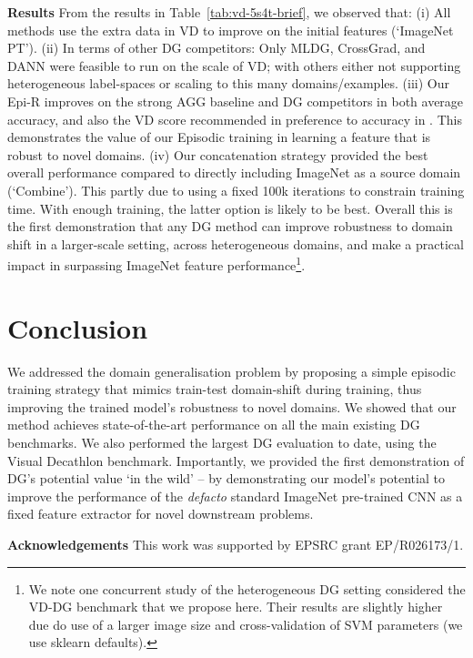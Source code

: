 \documentclass[10pt,twocolumn,letterpaper]{article}
\newcommand{\keypoint}[1]{\vspace{0.1cm}\noindent\textbf{#1}\quad}
\begin{document}
\keypoint{Results} From the results in Table~\ref{tab:vd-5s4t-brief}, we observed that: (i) All methods use the extra data in VD to improve on the initial features (`ImageNet PT'). (ii) In terms of other DG competitors: Only  MLDG, CrossGrad, and DANN were feasible to run on the scale of VD; with others either not supporting heterogeneous label-spaces or scaling to this many domains/examples.  (iii) Our Epi-R improves on the strong AGG baseline and DG competitors in both average accuracy, and also the VD score recommended in preference to accuracy in \cite{Rebuffi17}. This demonstrates the value of our Episodic training in learning a feature that is robust to novel domains. (iv) Our concatenation strategy provided the best overall performance compared to directly including ImageNet as a source domain (`Combine'). This partly due to using a fixed 100k iterations to constrain training time. With enough training, the latter option is likely to be best. Overall this is the first demonstration that any DG method can improve robustness to domain shift in a larger-scale setting, across heterogeneous domains, and make a practical impact in surpassing ImageNet feature performance\footnote{We note one concurrent study of the heterogeneous DG setting \cite{li2019featureCritic} considered the VD-DG benchmark that we propose here. Their results are slightly higher due do use of a larger image size and cross-validation of SVM parameters (we use sklearn defaults).}.










\section{Conclusion} We addressed the domain generalisation problem by proposing a simple episodic training strategy that mimics train-test domain-shift during training, thus improving the trained model's robustness to novel domains. We showed that our method achieves state-of-the-art performance on all the main existing DG benchmarks. We also performed the largest DG evaluation to date, using the Visual Decathlon benchmark. Importantly, we provided the first demonstration of DG's potential value `in the wild' -- by demonstrating our model's potential to improve the performance of the \emph{defacto} standard ImageNet pre-trained CNN as a fixed feature extractor for novel downstream problems. 

\keypoint{Acknowledgements} This work was supported by EPSRC
grant EP/R026173/1.
\end{document}
